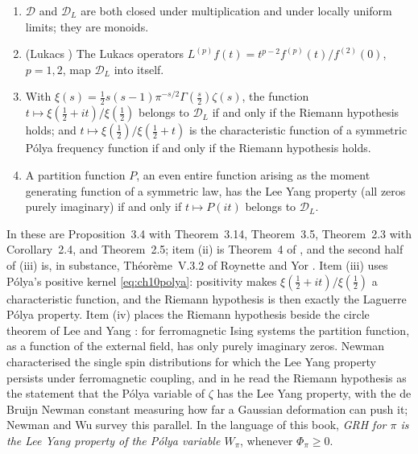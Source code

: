 \begin{theorem}\label{thm:10dkps}
\begin{enumerate}
\item[(i)] $\mathcal D$ and $\mathcal D_L$ are both closed under multiplication and under locally uniform limits; they are monoids.
\item[(ii)] (Lukacs \cite{lukacs1968}) The Lukacs operators $L^{(p)}f(t) = t^{p-2}f^{(p)}(t)/f^{(2)}(0)$, $p=1,2$, map $\mathcal D_L$ into itself.
\item[(iii)] With $\xi(s) = \frac12s(s-1)\pi^{-s/2}\Gamma(\frac s2)\zeta(s)$, the function $t\mapsto\xi(\frac12+it)/\xi(\frac12)$ belongs to $\mathcal D_L$ if and only if the Riemann hypothesis holds; and $t\mapsto\xi(\frac12)/\xi(\frac12+t)$ is the characteristic function of a symmetric P\'olya frequency function if and only if the Riemann hypothesis holds.
\item[(iv)] A partition function $P$, an even entire function arising as the moment generating function of a symmetric law, has the Lee Yang property (all zeros purely imaginary) if and only if $t\mapsto P(it)$ belongs to $\mathcal D_L$.
\end{enumerate}
\end{theorem}

In \cite{konstantopoulospatiesarkar2024} these are Proposition~3.4 with Theorem~3.14, Theorem~3.5, Theorem~2.3 with Corollary~2.4, and Theorem~2.5; item (ii) is Theorem~4 of \cite{lukacs1968}, and the second half of (iii) is, in substance, Th\'eor\`eme~V.3.2 of Roynette and Yor \cite{roynetteyor2005}. Item (iii) uses P\'olya's positive kernel \eqref{eq:ch10polya}: positivity makes $\xi(\frac12+it)/\xi(\frac12)$ a characteristic function, and the Riemann hypothesis is then exactly the Laguerre P\'olya property. Item (iv) places the Riemann hypothesis beside the circle theorem of Lee and Yang \cite{leeyang1952}: for ferromagnetic Ising systems the partition function, as a function of the external field, has only purely imaginary zeros. Newman \cite{newman1974} characterised the single spin distributions for which the Lee Yang property persists under ferromagnetic coupling, and in \cite{newman1976} he read the Riemann hypothesis as the statement that the P\'olya variable of $\zeta$ has the Lee Yang property, with the de Bruijn Newman constant measuring how far a Gaussian deformation can push it; Newman and Wu \cite{newmanwu2020} survey this parallel. In the language of this book, \emph{GRH for $\pi$ is the Lee Yang property of the P\'olya variable $W_\pi$}, whenever $\Phi_\pi\ge0$.

